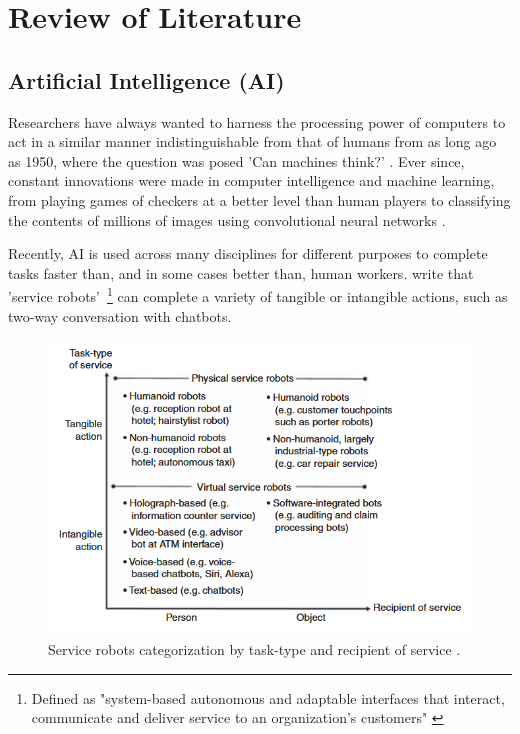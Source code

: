 \documentclass[12pt]{report}
\begin{document}
    \pagebreak %

    \section{Review of Literature}

    \subsection{Artificial Intelligence (AI)}


    Researchers have always wanted to harness the processing power of computers to act in a similar manner 
    indistinguishable from that of humans from as long ago as 1950, where the question was posed 
    'Can machines think?' \autocite{turing_icomputing_1950}. Ever since, constant innovations were made in computer 
    intelligence and machine learning, from playing games of checkers at a better level than human players \autocite{samuel_studies_1959}
    to classifying the contents of millions of images using convolutional neural networks \autocite{krizhevsky_imagenet_2012}.

    Recently, AI is used across many disciplines for different purposes to complete tasks faster than, and in some cases better than,
    human workers. \textcite{wirtz_brave_2018} write that 'service robots'~\footnote{Defined as "system-based autonomous and adaptable interfaces that 
    interact, communicate and deliver service to an organization’s customers" \autocite[p.909]{wirtz_brave_2018}} can complete a variety of 
    tangible or intangible actions, such as two-way conversation with chatbots.
    
    \begin{figure}[H]
        \centering
        \includegraphics[width=.8\linewidth]{serviceBots.png}
        \caption{Service robots categorization by task-type and recipient of service \autocite{wirtz_brave_2018}.}
        \label{fig:serviceBots}
    \end{figure}
\end{document}

